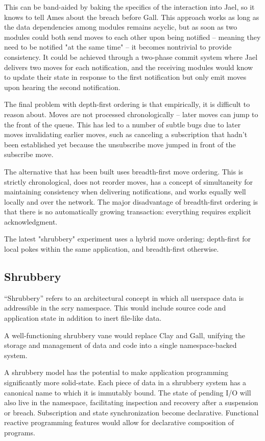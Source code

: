 \documentclass[twoside]{article}
\begin{document}
This can be band-aided by baking the specifics of the interaction into Jael, so it knows to tell Ames about the breach before Gall.  This approach works as long as the data dependencies among modules remains acyclic, but as soon as two modules could both send moves to each other upon being notified – meaning they need to be notified "at the same time" – it becomes nontrivial to provide consistency.  It could be achieved through a two-phase commit system where Jael delivers two moves for each notification, and the receiving modules would know to update their state in response to the first notification but only emit moves upon hearing the second notification.

The final problem with depth-first ordering is that empirically, it is difficult to reason about.  Moves are not processed chronologically – later moves can jump to the front of the queue.  This has led to a number of subtle bugs due to later moves invalidating earlier moves, such as canceling a subscription that hadn't been established yet because the unsubscribe move jumped in front of the subscribe move.

The alternative that has been built uses breadth-first move ordering.  This is strictly chronological, does not reorder moves, has a concept of simultaneity for maintaining consistency when delivering notifications, and works equally well locally and over the network.  The major disadvantage of breadth-first ordering is that there is no automatically growing transaction: everything requires explicit acknowledgment.

The latest "shrubbery" experiment uses a hybrid move ordering: depth-first for local pokes within the same application, and breadth-first otherwise.

\subsection{Shrubbery}

``Shrubbery'' refers to an architectural concept in which all userspace data is addressible in the scry namespace.  This would include source code and application state in addition to inert file-like data.

A well-functioning shrubbery vane would replace Clay and Gall, unifying the storage and management of data and code into a single namespace-backed system.

A shrubbery model has the potential to make application programming significantly more solid-state.  Each piece of data in a shrubbery system has a canonical name to which it is immutably bound.  The state of pending I/O will also live in the namespace, facilitating inspection and recovery after a suspension or breach.  Subscription and state synchronization become declarative.  Functional reactive programming features would allow for declarative composition of programs.
\end{document}
